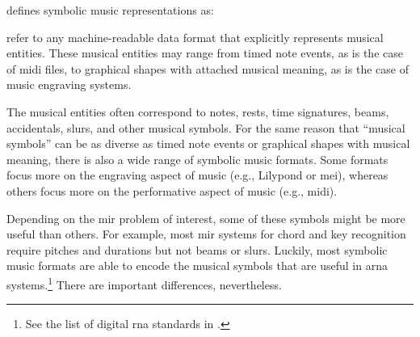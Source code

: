 

\textcite[p.~1]{muller2015music} defines symbolic music
representations as:

\begin{italicsquote}
 refer to any machine-readable
data format that explicitly represents musical entities.
These musical entities may range from timed note events, as
is the case of \gls{midi} ﬁles, to graphical shapes with
attached musical meaning, as is the case of music engraving
systems.
\end{italicsquote}


The musical entities often correspond to notes, rests, time
signatures, beams, accidentals, slurs, and other musical
symbols. For the same reason that ``musical symbols'' can be
as diverse as timed note events or graphical shapes with
musical meaning, there is also a wide range of symbolic
music formats. Some formats focus more on the engraving
aspect of music (e.g., Lilypond or \gls{mei}), whereas
others focus more on the performative aspect of music (e.g.,
\gls{midi}).

Depending on the \gls{mir} problem of interest, some of
these symbols might be more useful than others. For example,
most \gls{mir} systems for chord and key recognition require
pitches and durations but not beams or slurs. Luckily, most
symbolic music formats are able to encode the musical
symbols that are useful in \gls{arna} systems.\footnote{See
the list of digital \gls{rna} standards in
.} There are
important differences, nevertheless.
